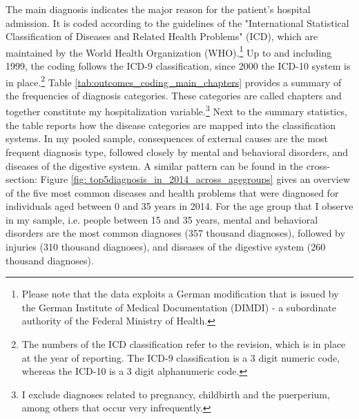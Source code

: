 \documentclass[11pt, a4paper,draft]{article} %
\begin{document}
The main diagnosis indicates the major reason for the patient's hospital admission. It is coded according to the guidelines of the "International Statistical Classification of Diseases and Related Health Problems" (ICD), which are maintained by the World Health Organization (WHO).\footnote{Please note that the data exploits a German modification that is issued by the German Institute of Medical Documentation (DIMDI) - a subordinate authority of the Federal Ministry of Health.} Up to and including 1999, the coding follows the ICD-9 classification, since 2000 the ICD-10 system is in place.\footnote{The numbers of the ICD classification refer to the revision, which is in place at the year of reporting. The ICD-9 classification is a 3 digit numeric code, whereas the ICD-10 is a 3 digit alphanumeric code.} Table \ref{tab:outcomes_coding_main_chapters} provides a summary of the frequencies of diagnosis categories. These categories are called chapters and together constitute my hospitalization variable.\footnote{I exclude diagnoses related to pregnancy, childbirth and the puerperium, among others that occur very infrequently.} Next to the summary statistics, the table reports how the disease categories are mapped into the classification systems. In my pooled sample, consequences of external causes are the most frequent diagnosis type, followed closely by mental and behavioral disorders, and diseases of the digestive system. A similar pattern can be found in the cross-section: Figure \ref{fig: top5diagnosis_in_2014_across_agegroups} gives an overview of the five most common diseases and health problems that were diagnosed for individuals aged between 0 and 35 years in 2014. For the age group that I observe in my sample, i.e. people between 15 and 35 years, mental and behavioral disorders are the most common diagnoses (357 thousand diagnoses), followed by injuries (310 thousand diagnoses), and diseases of the digestive system (260 thousand diagnoses). \newline %
\end{document}
